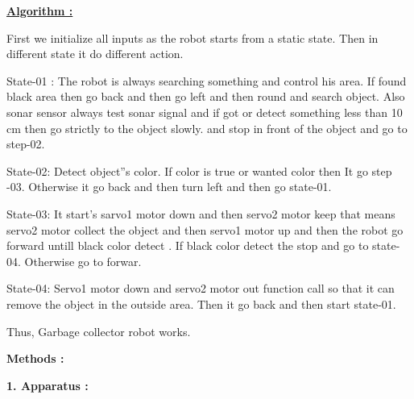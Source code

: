 \documentclass[12pt]{article}
\begin{document}
{\fontsize{17pt}{20.4pt}\selectfont \textbf{\uline{Algorithm :} }{\fontsize{14pt}{16.8pt}\selectfont First we initialize all inputs as the robot starts from a static state.  Then in different state it do different action.

State-01 : 
	The robot is always searching something and control his area. If found black area then go back and then go left and then round and search object. Also sonar sensor always test sonar signal and if got or detect something less than 10 cm then go strictly to the object slowly. and stop in front of the object and go to step-02.

State-02:
	 Detect object''s color. If color is true or wanted color then  It go step -03. Otherwise it go back and then turn  left and then go state-01.

State-03:
	It start's sarvo1 motor down and then servo2 motor keep that means servo2 motor collect the object and then servo1 motor up and then the robot go forward untill black color detect . If black color detect the stop and go to state-04. Otherwise go to forwar.

State-04:
	Servo1 motor down and servo2 motor out function call so that it can remove the object in the outside area. Then it go back and then start state-01.

Thus, Garbage collector robot works.

\par}\par}\par

{\fontsize{19pt}{22.8pt}\selectfont \textbf{Methods :\tab}\par}\par

{\fontsize{18pt}{21.6pt}\selectfont \textbf{1. Apparatus :\tab }\par}\par
\end{document}
